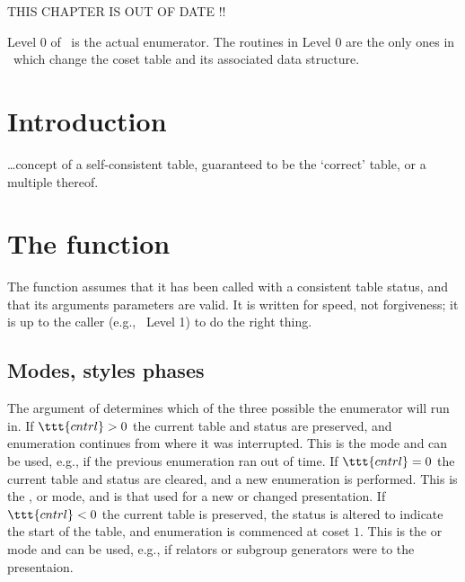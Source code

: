 
%
%

THIS CHAPTER IS OUT OF DATE !!

Level 0 of \ace\ is the actual enumerator.
The routines in Level 0 are the only ones in \ace\ which change the coset
  table and its associated data structure.

\section{Introduction}

\dots concept of a self-consistent table, guaranteed to be the `correct'
  table, or a multiple thereof.

\section{The  function}

The  function assumes that it has been called with a 
  consistent table \amp status, and that its arguments \amp parameters
  are valid.
It is written for speed, not forgiveness; it is up to the caller (e.g.,
  \ace\ Level 1) to do the right thing.

\subsection{Modes, styles \amp phases}

The  argument of  determines which of the 
  three possible  the enumerator will run in.
If $\ttt{cntrl} > 0$ the current table and status are preserved, and
  enumeration continues from where it was interrupted.
This is the  mode and can be used, e.g., if
  the previous enumeration ran out of time.
If $\ttt{cntrl} = 0$ the current table and status are cleared, and a new
  enumeration is performed.
This is the ,  or  mode, and is that used
  for a new or changed presentation.
If $\ttt{cntrl} < 0$ the current table is preserved, the status is altered
  to indicate the start of the table, and enumeration is commenced at
  coset $1$.
This is the  or  mode and can be used, e.g., if 
  relators or subgroup generators were  to the presentaion.

